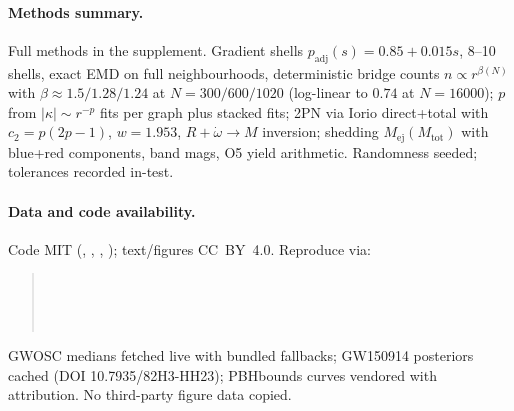 \documentclass[11pt]{article}
\begin{document}
\paragraph{Methods summary.}
Full methods in the supplement. Gradient shells
$p_{\mathrm{adj}}(s) = 0.85+0.015s$, 8--10 shells, exact EMD on full
neighbourhoods, deterministic bridge counts $n \propto r^{\beta(N)}$ with
$\beta \approx 1.5/1.28/1.24$ at $N = 300/600/1020$ (log-linear to
$0.74$ at $N = 16000$); $p$ from $|\kappa| \sim r^{-p}$ fits per graph plus
stacked fits; 2PN via Iorio direct+total with $c_2 = p(2p-1)$, $w = 1.953$,
$R+\dot\omega \to M$ inversion; shedding $M_{\mathrm{ej}}(M_{\mathrm{tot}})$
with blue+red components, band mags, O5 yield arithmetic. Randomness seeded;
tolerances recorded in-test.

\paragraph{Data and code availability.}
Code MIT (, , , );
text/figures CC~BY~4.0. Reproduce via:
\begin{quote}\small
{}\\
\\
\\
\end{quote}
GWOSC medians fetched live with bundled fallbacks; GW150914 posteriors cached
(DOI 10.7935/82H3-HH23); PBHbounds curves vendored with attribution. No
third-party figure data copied.
\end{document}
